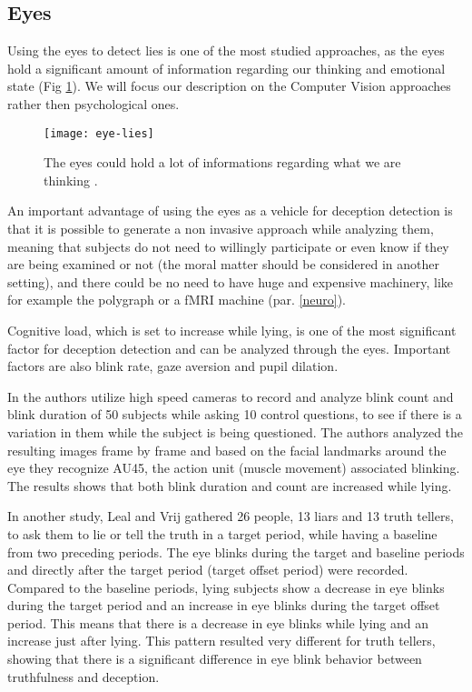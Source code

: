 \clearpage
 
\subsection{Eyes}
Using the eyes to detect lies is one of the most studied approaches, as the eyes hold a significant amount of information regarding our thinking and emotional state \cite{FUKUDA2001239} (Fig \ref{fig:eye-lies}). We will focus our description on the Computer Vision approaches rather then psychological ones.

\begin{figure}[H]
	\centering
	\texttt{[image: eye-lies]}
	\caption{The eyes could hold a lot of informations regarding what we are thinking \cite{eyeLies}.}
	\label{fig:eye-lies}
\end{figure}

An important advantage of using the eyes as a vehicle for deception detection is that it is possible to generate a non invasive approach while analyzing them, meaning that subjects do not need to willingly participate or even know if they are being examined or not (the moral matter should be considered in another setting), and there could be no need to have huge and expensive machinery, like for example the polygraph or a fMRI machine (par. \ref{neuro}).

Cognitive load, which is set to increase while lying, is one of the most significant factor for deception detection and can be analyzed through the eyes. Important factors are also blink rate, gaze aversion and pupil dilation.

In \cite{8125844} the authors utilize high speed cameras to record and analyze blink count and blink duration of 50 subjects while asking 10 control questions, to see if there is a variation in them while the subject is being questioned. The authors analyzed the resulting images frame by frame and based on the facial landmarks around the eye they recognize AU45, the action unit (muscle movement) associated blinking. The results shows that both blink duration and count are increased while lying.

In another study, Leal and Vrij \cite{Leal2008} gathered 26 people, 13 liars and 13 truth tellers, to ask them to lie or tell the truth in a target period, while having a baseline from two preceding periods. The eye blinks during the target and baseline periods and directly after the target period (target offset period) were recorded.\\
Compared to the baseline periods, lying subjects show a decrease in eye blinks during the target period and an increase in eye blinks during the target offset period. This means that there is a decrease in eye blinks while lying and an increase just after lying. This pattern resulted very different for truth tellers, showing that there is a significant difference in eye blink behavior between truthfulness and deception.

